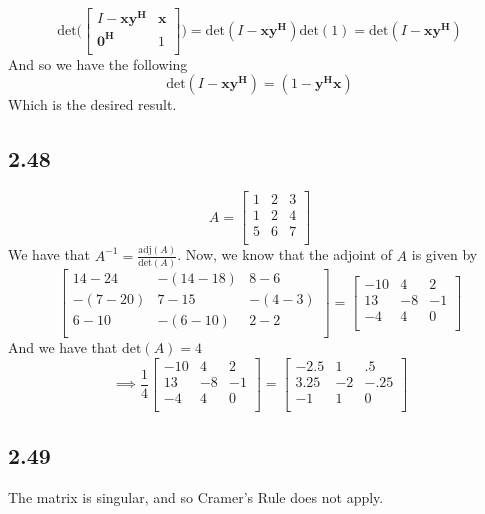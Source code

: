 \documentclass[letterpaper,12pt]{article}
\theoremstyle{definition}
\begin{document}
\[
 \text{det}  \Big(
\begin{bmatrix}
    I-\mathbf{xy^H} & \mathbf{x} \\
    \mathbf{0^H} & 1 \\
\end{bmatrix}
 \Big)
 = \text{det}(I - \mathbf{xy^H} ) \text{det}(1) = \text{det}(I - \mathbf{xy^H} )
 \]
 And so we have the following
 \[\text{det}(I - \mathbf{xy^H} )
= (1- \mathbf{y^Hx})\]
Which is the desired result.

\subsection*{2.48}
\[A = 
\begin{bmatrix}
    1& 2 & 3 \\
    1& 2 & 4 \\
    5& 6 & 7 \\
\end{bmatrix}
\]
We have that $A^{-1} = \frac{\text{adj}(A) }{\text{det}(A)}$. Now, we know that the adjoint of $A$ is given by 
\[
\begin{bmatrix}
    14-24 & -(14-18) & 8-6 \\
    -(7-20) & 7-15 & -(4-3) \\
    6-10 & -(6-10) & 2-2 \\
\end{bmatrix}
 =
\begin{bmatrix}
    -10 & 4 & 2 \\
    13 & -8 & -1 \\
    -4 & 4 & 0 \\
\end{bmatrix}
\]
And we have that $\text{det}(A) = 4$
\[ \implies 
\frac{1}{4}
\begin{bmatrix}
    -10 & 4 & 2 \\
    13 & -8 & -1 \\
    -4 & 4 & 0 \\
\end{bmatrix}
=
\begin{bmatrix}
    -2.5 & 1 & .5 \\
    3.25 & -2 & -.25 \\
    -1 & 1 & 0 \\
\end{bmatrix}
\]
\subsection*{2.49}
The matrix is singular, and so Cramer's Rule does not apply.
\end{document}
